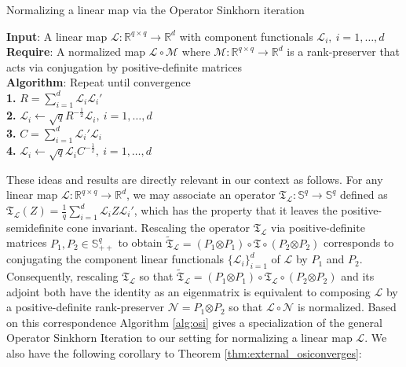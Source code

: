 \documentclass[11pt,letterpaper]{article}
\newcommand{\R}{\mathbb{R}}
\renewcommand{\L}{\mathcal{L}}
\newcommand{\T}{\mathfrak{T}}
\renewcommand{\S}{\mathbb{S}}
\newcommand{\botimes}{\boldsymbol \otimes}
\begin{document}
\begin{algorithm}[t] 
    \caption{Normalizing a linear map via the Operator Sinkhorn iteration}
    \label{alg:osi}
    \textbf{Input}: A linear map $\L: \R^{q \times q} \rightarrow \R^d$ with component functionals $\L_{i}, ~i=1,\dots,d$ \\
    \textbf{Require}: A normalized map $\L \circ \mathcal{M}$ where $\mathcal{M}: \R^{q \times q} \rightarrow \R^d$ is a rank-preserver that acts via conjugation by positive-definite matrices \\
    \textbf{Algorithm}: Repeat until convergence \\
    \textbf{1.} $R = \sum_{i=1}^d \L_{i} {\L_{i}}'$ \\
    \textbf{2.} $\L_{i} \leftarrow \sqrt{q} R^{-\tfrac{1}{2}} \L_{i}, ~ i=1,\dots,d$ \\
    \textbf{3.} $C = \sum_{i=1}^d {\L_{i}}' \L_{i}$ \\
    \textbf{4.} $\L_{i} \leftarrow \sqrt{q} \L_{i} C^{-\tfrac{1}{2}}, ~ i=1,\dots,d$

\end{algorithm}

These ideas and results are directly relevant in our context as follows.  For any linear map $\L : \R^{q \times q} \rightarrow \R^d$, we may associate an operator $\mathfrak{T}_\L : \S^q \rightarrow \S^q$ defined as $\T_\L(Z) = \frac{1}{q}\sum_{i=1}^d \L_{i} Z {\L_{i}}'$, which has the property that it leaves the positive-semidefinite cone invariant.  Rescaling the operator $\T_\L$ via positive-definite matrices $P_1,P_2 \in \S^q_{++}$ to obtain $\tilde{\T}_\L = (P_1 \botimes P_1) \circ \T \circ (P_2 \botimes P_2)$ corresponds to conjugating the component linear functionals $\{\L_{i}\}_{i=1}^d$ of $\L$ by $P_1$ and $P_2$.  Consequently, rescaling $\T_\L$ so that $\tilde{\T}_\L = (P_1 \botimes P_1) \circ \T_\L \circ (P_2 \botimes P_2)$ and its adjoint both have the identity as an eigenmatrix is equivalent to composing $\L$ by a positive-definite rank-preserver $\mathcal{N} = P_1 \botimes P_2$ so that $\L \circ \mathcal{N}$ is normalized.  Based on this correspondence Algorithm \ref{alg:osi} gives a specialization of the general Operator Sinkhorn Iteration to our setting for normalizing a linear map $\L$.  We also have the following corollary to Theorem \ref{thm:external_osiconverges}:
\end{document}

